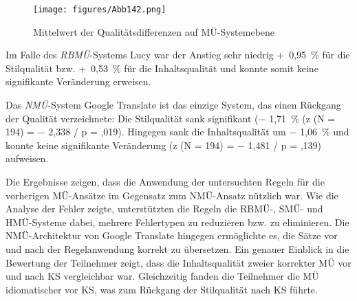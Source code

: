 \begin{figure}



















\texttt{[image: figures/Abb142.png]}






\caption{\label{fig:05:142}Mittelwert der Qualitätsdifferenzen auf MÜ-Systemebene   }
\end{figure}

Im Falle des \textit{RBMÜ}-Systems Lucy war der Anstieg sehr niedrig +~0,95~\% für die Stilqualität bzw. +~0,53~\% für die Inhaltsqualität und konnte somit keine signifikante Veränderung erweisen.

Das \textit{NMÜ}{}-System Google Translate ist das einzige System, das einen Rückgang der Qualität verzeichnete: Die Stilqualität sank signifikant ($-$ 1,71~\% (z (N = 194) = $-$ 2,338 / p = ,019). Hingegen sank die Inhaltsqualität um $-$ 1,06~\% und konnte keine signifikante Veränderung (z (N = 194) = $-$ 1,481 / p = ,139) aufweisen.

Die Ergebnisse zeigen, dass die Anwendung der untersuchten Regeln für die vorherigen MÜ-Ansätze im Gegensatz zum NMÜ-Ansatz nützlich war. Wie die Analyse der Fehler zeigte, unterstützten die Regeln die RBMÜ-, SMÜ- und HMÜ-Systeme dabei, mehrere Fehlertypen zu reduzieren bzw. zu eliminieren. Die NMÜ-Architektur von Google Translate hingegen ermöglichte es, die Sätze vor und nach der Regelanwendung korrekt zu übersetzen. Ein genauer Einblick in die Bewertung der Teilnehmer zeigt, dass die Inhaltsqualität zweier korrekter MÜ vor und nach KS vergleichbar war. Gleichzeitig fanden die Teilnehmer die MÜ idiomatischer vor KS, was zum Rückgang der Stilqualität nach KS führte.

